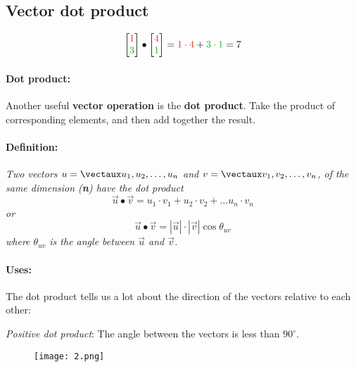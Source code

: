 \documentclass{article}
\begin{document}
\color{white}
\subsection{Vector dot product}
\color{black}

\begin{equation*}
 \icol{\color{rooj} 1 \\ \color{groen} 3 \color{black} } \bullet \icol{\color{rooj} 4 \\ \color{groen} 1 \color{black} } = \color{rooj} 1 \cdot 4  \color{black} + \color{groen}  3 \cdot 1 \color{black} = 7
\end{equation*}





\paragraph{Dot product:} Another useful \textbf{vector operation} is the \textbf{dot product}. Take the product of corresponding elements, and then add together the result. 

\color{theorem} \paragraph{Definition:} \textit{Two vectors $u=\vect{u_1, u_2,\dots,u_n}$ and $v=\vect{v_1,v_2,\dots,v_n}$, of the same dimension (\textbf{n}) have the dot product 
\[
\vec{u}\bullet \vec{v} = u_1\cdot v_1 + u_2\cdot v_2+ \dots u_n\cdot v_n 
\]
or
\[
\vec{u}\bullet \vec{v} = |\vec{u}|\cdot |\vec{v}| \cos \theta_{uv}
\]
where $\theta_{uv}$ is the angle between $\vec{u}$ and $\vec{v}$.
} \color{black}

\paragraph{Uses:} The dot product tells us a lot about the direction of the vectors relative to each other:


\begin{minipage}{0.45\textwidth}
\begin{flushleft}
\textit{Positive dot product}: The angle between the vectors is less than $90^\circ$. 
\end{flushleft}
\end{minipage} \hfill
\begin{minipage}{0.45\textwidth}
\begin{figure}[H]
\texttt{[image: 2.png]}
\end{figure}
\end{minipage}
\end{document}
